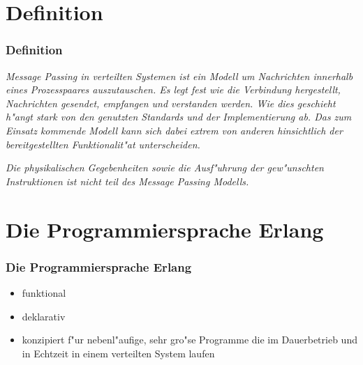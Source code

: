 \documentclass[aspectratio=169]{beamer}
\begin{document}
\section{Definition}

\begin{frame}

\frametitle{Definition}

\begin{center}
\textit{Message Passing in verteilten Systemen ist ein Modell um Nachrichten innerhalb eines Prozesspaares auszutauschen. Es legt fest wie die Verbindung hergestellt, Nachrichten gesendet, empfangen und verstanden werden. Wie dies geschieht h"angt stark von den genutzten Standards und der Implementierung ab. Das zum Einsatz kommende Modell kann sich dabei extrem von anderen hinsichtlich der bereitgestellten Funktionalit"at unterscheiden.}
\end{center}
\pause
\begin{center}
\textit{Die physikalischen Gegebenheiten sowie die Ausf"uhrung der gew"unschten Instruktionen ist nicht teil des Message Passing Modells.}
\end{center}

\end{frame}

\section{Die Programmiersprache Erlang}

\begin{frame}

\frametitle{Die Programmiersprache Erlang}

\begin{itemize}
\item funktional
\pause
\item deklarativ
\pause
\item konzipiert f"ur nebenl"aufige, sehr gro"se Programme die im Dauerbetrieb und in Echtzeit in einem verteilten System laufen
\end{itemize}

\begin{flushright}
\cite{Armstrong96erlang}\\
\cite{erl_history}
\end{flushright}

\end{frame}
\end{document}

